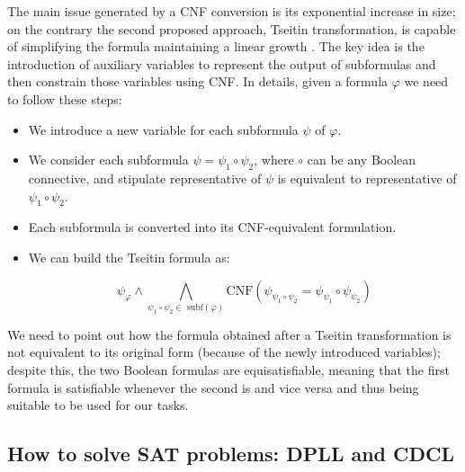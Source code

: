 The main issue generated by a CNF conversion is its exponential increase in size; on the contrary the second proposed approach, Tseitin transformation, is capable of simplifying the formula maintaining a linear growth \cite{pa27}. The key idea is the introduction of auxiliary variables to represent the output of subformulas
and then constrain those variables using CNF. In details, given a formula $\varphi$ we need to follow these steps:

\begin{itemize}
    \item We introduce a new variable for each subformula $\psi$ of $\varphi$.
    \item We consider each subformula $\psi = \psi_1 \circ \psi_2$, where $\circ$ can be any Boolean connective, and stipulate representative of $\psi$ is equivalent to representative of $\psi_1 \circ \psi_2$.
    \item Each subformula is converted into its CNF-equivalent formulation.
    \item We can build the Tseitin formula as:
    
    \begin{equation}
        \psi_\varphi \wedge \bigwedge_{\psi_1 \circ \psi_2 \in \textrm{  subf}(\varphi)} \textrm{CNF}(\psi_{\psi_1 \circ \psi_2} = \psi_{\psi_1} \circ \psi_{\psi_2})
    \end{equation}
\end{itemize}

We need to point out how the formula obtained after a Tseitin transformation is not equivalent to its original form (because of the newly introduced variables); despite this, the two Boolean formulas are equisatisfiable, meaning that the first formula is satisfiable whenever the second is and vice versa and thus being suitable to be used for our tasks.

\subsection{How to solve SAT problems: DPLL and CDCL}

